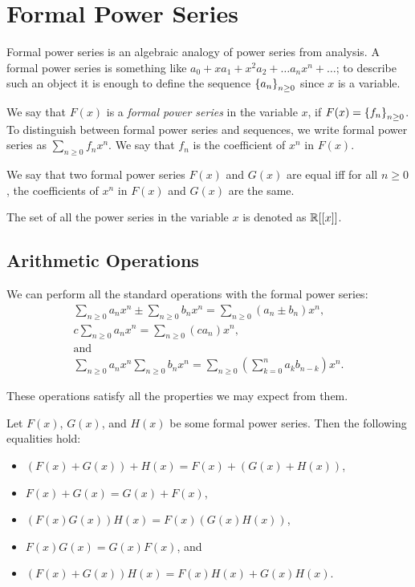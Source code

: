 \chapter{Formal Power Series}
\label{chapter:formal-power-series}
Formal power series is an algebraic analogy of power series from analysis.
A formal power series is something like
$a_0 + x a_1 + x^2 a_2 + \dots a_n x^n + \dots$; to describe such an object it
is enough to define the sequence $\set{a_n}_{n \ge 0}$ since $x$ is a variable.
\begin{definition}
  We say that $F(x)$ is a \emph{formal power series} in the variable $x$, if
  $F(x) = \set{f_n}_{n \ge 0}$. To distinguish between formal power series and
  sequences, we write formal power series as $\sum_{n \ge 0} f_n x^n$.
  We say that $f_n$ is the coefficient of $x^n$ in $F(x)$.

  We say that two formal power series $F(x)$ and $G(x)$ are equal iff for all
  $n \ge  0$, the coefficients of $x^n$ in $F(x)$ and $G(x)$ are the same.

  The set of all the power series in the variable $x$ is denoted as
  ${\mathbb{R}}[[x]]$.
\end{definition}

\section{Arithmetic Operations}

We can perform all the standard operations with the formal power series:
\begin{gather*}
  \sum_{n \ge 0} a_n x^n \pm \sum_{n \ge 0} b_n x^n =
  \sum_{n \ge 0} (a_n \pm b_n) x^n, \\
  c \sum_{n \ge 0} a_n x^n =
  \sum_{n \ge 0} (c a_n) x^n,
  \\
  \text{and} \\
  \sum_{n \ge 0} a_n x^n \sum_{n \ge 0} b_n x^n =
  \sum_{n \ge 0} (\sum_{k = 0}^n a_{k} b_{n - k}) x^n.
\end{gather*}

These operations satisfy all the properties we may expect from them.
\begin{theorem}
  Let $F(x)$, $G(x)$, and $H(x)$ be some formal power series. Then the following
  equalities hold:
  \begin{itemize}
    \item $(F(x) + G(x)) + H(x) = F(x) + (G(x) + H(x))$,
    \item $F(x) + G(x) = G(x) + F(x)$,
    \item $(F(x) G(x)) H(x) = F(x) (G(x) H(x))$,
    \item $F(x) G(x) = G(x) F(x)$, and
    \item $(F(x) + G(x)) H(x) = F(x)H(x) + G(x)H(x)$.
  \end{itemize}
\end{theorem}


